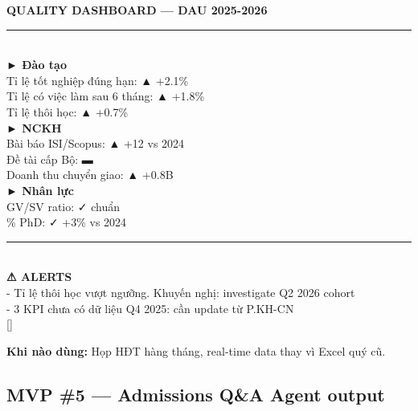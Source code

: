\documentclass[11pt,a4paper]{article}
\begin{document}
\begin{mockbox}
{\bfseries\color{ink} QUALITY DASHBOARD --- DAU 2025-2026}\\[6pt]
\rule{\linewidth}{0.3pt}\\[4pt]
{\bfseries\color{ink} ► Đào tạo}\\[2pt]
Tỉ lệ tốt nghiệp đúng hạn:  \textcolor{ok}{▲ +2.1\%}\\
Tỉ lệ có việc làm sau 6 tháng:  \textcolor{ok}{▲ +1.8\%}\\
Tỉ lệ thôi học:  \textcolor{warn}{▲ +0.7\%}\\[6pt]
{\bfseries\color{ink} ► NCKH}\\[2pt]
Bài báo ISI/Scopus:  \textcolor{ok}{▲ +12 vs 2024}\\
Đề tài cấp Bộ:  \textcolor{mid}{▬}\\
Doanh thu chuyển giao:  \textcolor{ok}{▲ +0.8B}\\[6pt]
{\bfseries\color{ink} ► Nhân lực}\\[2pt]
GV/SV ratio:  \textcolor{ok}{✓ chuẩn}\\
\% PhD:  \textcolor{ok}{✓ +3\% vs 2024}\\[6pt]
\rule{\linewidth}{0.3pt}\\[4pt]
{\bfseries\color{warn} ⚠ ALERTS}\\[2pt]
- Tỉ lệ thôi học vượt ngưỡng. Khuyến nghị: investigate Q2 2026 cohort\\
- 3 KPI chưa có dữ liệu Q4 2025: cần update từ P.KH-CN\\[4pt]
{[]  }
\end{mockbox}

\textbf{Khi nào dùng:} Họp HĐT hàng tháng, real-time data thay vì Excel quý cũ.

\subsection{MVP \#5 — Admissions Q\&A Agent output}
\end{document}
